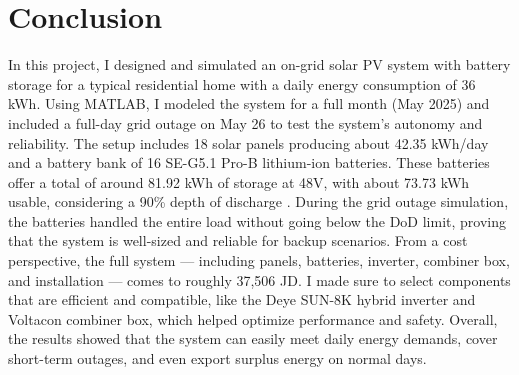 \documentclass{article}
\begin{document}
\section{ Conclusion}
In this project, I designed and simulated an on-grid solar PV system with battery storage for a typical residential home with a daily energy consumption of 36 kWh. Using MATLAB, I modeled the system for a full month (May 2025) and included a full-day grid outage on May 26 to test the system’s autonomy and reliability.
The setup includes 18 solar panels producing about 42.35 kWh/day and a battery bank of 16 SE-G5.1 Pro-B lithium-ion batteries. These batteries offer a total of around 81.92 kWh of storage at 48V, with about 73.73 kWh usable, considering a 90\% depth of discharge . During the grid outage simulation, the batteries handled the entire load without going below the DoD limit, proving that the system is well-sized and reliable for backup scenarios.
From a cost perspective, the full system — including panels, batteries, inverter, combiner box, and installation — comes to roughly 37,506 JD. I made sure to select components that are efficient and compatible, like the Deye SUN-8K hybrid inverter and Voltacon combiner box, which helped optimize performance and safety.
Overall, the results showed that the system can easily meet daily energy demands, cover short-term outages, and even export surplus energy on normal days. 

\nocite{*}
\end{document}
